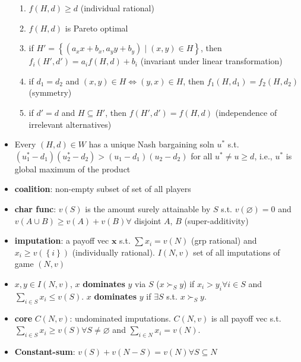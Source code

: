 \documentclass[8pt]{article}
\begin{document}
\begin{multicols*}{3}
\begin{itemize}
\begin{enumerate}
                \item $f\left(H, d\right) \geq d$ (individual rational)
                \item $f\left(H, d\right)$ is Pareto optimal 
                \item if $H' = \left\{\left(a_xx + b_x, a_yy + b_y\right) \mid \left(x, y\right) \in H\right\}$, then $f_i\left(H', d'\right) = a_if\left(H, d\right) + b_i$ (invariant under linear transformation)
                \item if $d_1 = d_2$ and $\left(x, y\right) \in H \iff \left(y, x\right) \in H$, then $f_1\left(H, d_1\right) = f_2\left(H, d_2\right)$ (symmetry)
                \item if $d' = d$ and $H \subseteq H'$, then $f\left(H', d'\right) = f\left(H, d\right)$ (independence of irrelevant alternatives)
            \end{enumerate}
            \item Every $\left(H, d\right) \in W$ has a unique Nash bargaining soln $u^*$ s.t. $\left(u_1^* - d_1\right)\left(u_2^* - d_2\right) > \left(u_1 - d_1\right)\left(u_2 - d_2\right)$ for all $u^* \neq u \geq d$, i.e., $u^*$ is global maximum of the product
            \item \textbf{coalition}: non-empty subset of set of all players
            \item \textbf{char func}: $v\left(S\right)$ is the amount surely attainable by $S$ s.t. $v\left(\varnothing\right) = 0$ and $v\left(A \cup B\right) \geq v\left(A\right) + v\left(B\right) \forall$ disjoint $A$, $B$ (super-additivity)
            \item \textbf{imputation}: a payoff vec $\bm{x}$ s.t. $\sum x_i = v\left(N\right)$ (grp rational) and $x_i \geq v\left(\left\{i\right\}\right)$ (individually rational). $I\left(N, v\right)$ set of all imputations of game $\left(N, v\right)$
            \item $x, y \in I\left(N, v\right)$, $x$ \textbf{dominates} $y$ via $S$ ($x \succ_S y$) if $x_i > y_i \forall i \in S$ and $\sum_{i \in S}x_i \leq v\left(S\right)$. $x$ \textbf{dominates} $y$ if $\exists S$ s.t. $x \succ_S y$.
            \item \textbf{core} $C\left(N, v\right)$: undominated imputations. $C\left(N, v\right)$ is all payoff vec s.t. $\sum_{i \in S}x_i \geq v\left(S\right) \forall S \neq \varnothing$ and $\sum_{i \in N}x_i = v\left(N\right)$.
            \item \textbf{Constant-sum}: $v\left(S\right) + v\left(N - S\right) = v\left(N\right)\forall S \subseteq N$

\end{itemize}
\end{multicols*}
\end{document}
